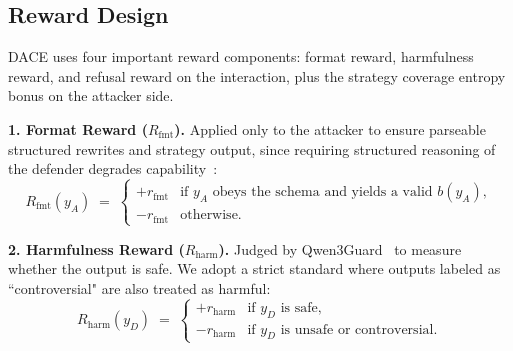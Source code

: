 \documentclass{article}
\newcommand{\method}{\textsc{DACE}\xspace}
\begin{document}
\subsection{Reward Design}
\label{sec:method-reward}

\method uses four important reward components: format reward, harmfulness reward, and refusal reward on the interaction, plus the strategy coverage entropy bonus on the attacker side.

\textbf{1. Format Reward ($R_{\mathrm{fmt}}$).}
Applied only to the attacker to ensure parseable structured rewrites and strategy output, since requiring structured reasoning of the defender degrades capability~\citep{magic2025}:
\begin{equation}
  R_{\mathrm{fmt}}(y_A) \;=\; \begin{cases}
    +r_{\mathrm{fmt}} & \text{if $y_A$ obeys the schema and yields a valid } b(y_A),\\
    -r_{\mathrm{fmt}} & \text{otherwise.}
  \end{cases}
\end{equation}

\textbf{2. Harmfulness Reward ($R_{\mathrm{harm}}$).}
Judged by Qwen3Guard~\citep{zhao2025qwen3guard} to measure whether the output is safe. We adopt a
strict standard where outputs labeled as “controversial" are also treated as harmful:
\begin{equation}
  R_{\mathrm{harm}}(y_D) \;=\; \begin{cases}
    +r_{\mathrm{harm}} & \text{if $y_D$ is safe},\\
    -r_{\mathrm{harm}} & \text{if $y_D$ is unsafe or controversial.}
  \end{cases}
\end{equation}
\end{document}
